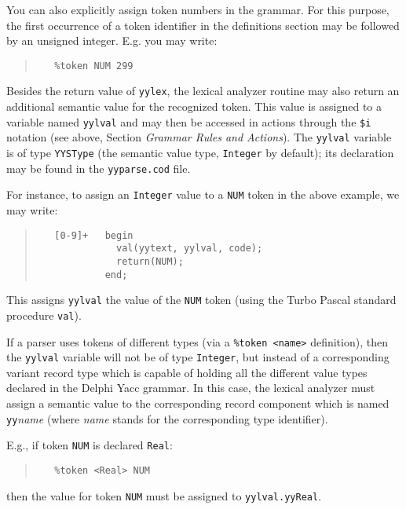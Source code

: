 \documentclass{article}
\begin{document}
You can also explicitly assign token numbers in the grammar. For this
purpose, the first occurrence of a token identifier in the definitions
section may be followed by an unsigned integer. E.g. you may write:
\begin{quote}\begin{verbatim}
   %token NUM 299
\end{verbatim}\end{quote}

Besides the return value of \verb"yylex", the lexical analyzer routine may
also return an additional semantic value for the recognized token. This value
is assigned to a variable named \verb"yylval" and may then be accessed in
actions through the \verb"$i" notation (see above, Section {\em Grammar
Rules and Actions\/}). The \verb"yylval" variable is of type \verb"YYSType"
(the semantic value type, \verb"Integer" by default); its declaration may be
found in the \verb"yyparse.cod" file.

For instance, to assign an \verb"Integer" value to a \verb"NUM" token in the
above example, we may write:

\begin{quote}\begin{verbatim}
   [0-9]+   begin
              val(yytext, yylval, code);
              return(NUM);
            end;
\end{verbatim}\end{quote}

This assigns \verb"yylval" the value of the \verb"NUM" token (using the Turbo
Pascal standard procedure \verb"val").

If a parser uses tokens of different types (via a \verb"%token <name>"
definition), then the \verb"yylval" variable will not be of type
\verb"Integer", but instead of a corresponding variant record type which is
capable of holding all the different value types declared in the Delphi Yacc
grammar. In this case, the lexical analyzer must assign a semantic value to
the corresponding record component which is named \verb"yy"{\em name\/}
(where {\em name\/} stands for the corresponding type identifier).

E.g., if token \verb"NUM" is declared \verb"Real":
\begin{quote}\begin{verbatim}
   %token <Real> NUM
\end{verbatim}\end{quote}
then the value for token \verb"NUM" must be assigned to \verb"yylval.yyReal".
\end{document}
